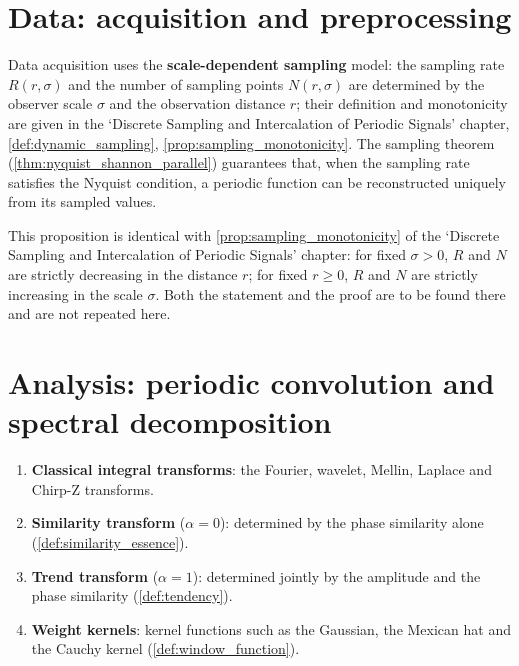 \section{Data: acquisition and preprocessing}

\begin{definition}\label{def:data_acquisition}
Data acquisition uses the \textbf{scale-dependent sampling} model: the sampling rate $R(r,\sigma)$ and the number of sampling points $N(r,\sigma)$ are determined by the observer scale $\sigma$ and the observation distance $r$; their definition and monotonicity are given in the `Discrete Sampling and Intercalation of Periodic Signals' chapter, \cref{def:dynamic_sampling}, \cref{prop:sampling_monotonicity}. The sampling theorem (\cref{thm:nyquist_shannon_parallel}) guarantees that, when the sampling rate satisfies the Nyquist condition, a periodic function can be reconstructed uniquely from its sampled values.
\end{definition}

\begin{remark}\label{prop:dynamic_sampling_monotonicity}
This proposition is identical with \cref{prop:sampling_monotonicity} of the `Discrete Sampling and Intercalation of Periodic Signals' chapter: for fixed $\sigma>0$, $R$ and $N$ are strictly decreasing in the distance $r$; for fixed $r\ge0$, $R$ and $N$ are strictly increasing in the scale $\sigma$. Both the statement and the proof are to be found there and are not repeated here.
\end{remark}

\section{Analysis: periodic convolution and spectral decomposition}

\begin{definition}\label{def:analysis_toolchain}
\begin{enumerate}[label=(\roman*)]
    \item \textbf{Classical integral transforms}: the Fourier, wavelet, Mellin, Laplace and Chirp-Z transforms.
    \item \textbf{Similarity transform} ($\alpha=0$): determined by the phase similarity alone (\cref{def:similarity_essence}).
    \item \textbf{Trend transform} ($\alpha=1$): determined jointly by the amplitude and the phase similarity (\cref{def:tendency}).
    \item \textbf{Weight kernels}: kernel functions such as the Gaussian, the Mexican hat and the Cauchy kernel (\cref{def:window_function}).
\end{enumerate}
\end{definition}

